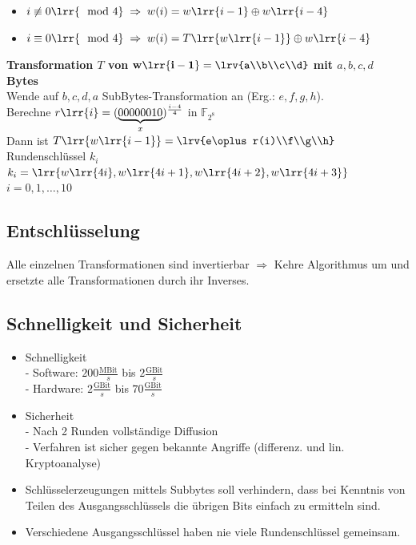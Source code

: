 		\begin{itemize}
			\item $i\not\equiv 0\lrr{\mod 4}\;\Rightarrow\;w(i)=w\lrr{i-1}\oplus w\lrr{i-4}$
			\item $i\equiv 0\lrr{\mod 4}\;\Rightarrow\;w(i)=T\lrr{w\lrr{i-1}}\oplus w\lrr{i-4}$
		\end{itemize}

		\textbf{Transformation $T$ von} $\mathbf{w\lrr{i-1}=\lrv{a\\b\\c\\d}}$ \textbf{mit $a,b,c,d$ Bytes}\\
		Wende auf $b,c,d,a$ SubBytes-Transformation an (Erg.: $e,f,g,h$).\\
		Berechne $r\lrr{i}=(\underbrace{00000010}_{x})^{\frac{i-4}{4}}$ in $\mathbb{F}_{2^8}$\\
		Dann ist $T\lrr{w\lrr{i-1}}=\lrv{e\oplus r(i)\\f\\g\\h}$ Rundenschlüssel $k_i$\\
		$k_i=\lrr{w\lrr{4i},w\lrr{4i+1},w\lrr{4i+2},w\lrr{4i+3}}$\\
		$i=0,1,\dots,10$
		
	\subsection{Entschlüsselung}
		Alle einzelnen Transformationen sind invertierbar $\Rightarrow$ Kehre Algorithmus um und ersetzte alle Transformationen durch ihr Inverses.
		
	\subsection{Schnelligkeit und Sicherheit}
		\begin{itemize}
			\item Schnelligkeit\\
				- Software: $200\frac{\text{MBit}}{s}$ bis $2\frac{\text{GBit}}{s}$\\
				- Hardware: $2\frac{\text{GBit}}{s}$ bis $70\frac{\text{GBit}}{s}$
			\item Sicherheit\\
				- Nach 2 Runden vollständige Diffusion\\
				- Verfahren ist sicher gegen bekannte Angriffe (differenz. und lin. Kryptoanalyse)
			\item Schlüsselerzeugungen mittels Subbytes soll verhindern, dass bei Kenntnis von Teilen des Ausgangsschlüssels die übrigen Bits einfach zu ermitteln sind.
			\item Verschiedene Ausgangsschlüssel haben nie viele Rundenschlüssel gemeinsam.
		\end{itemize}
	
